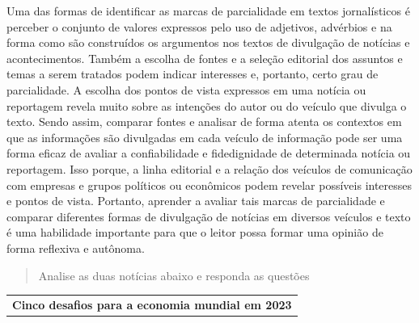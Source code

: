 {{Uma das formas de identificar as marcas de parcialidade em textos
jornalísticos é perceber o conjunto de valores expressos pelo uso de
adjetivos, advérbios e na forma como são construídos os argumentos nos
textos de divulgação de notícias e acontecimentos. Também a escolha de
fontes e a seleção editorial dos assuntos e temas a serem tratados podem
indicar interesses e, portanto, certo grau de parcialidade. A escolha
dos pontos de vista expressos em uma notícia ou reportagem revela muito
sobre as intenções do autor ou do veículo que divulga o texto. Sendo
assim, comparar fontes e analisar de forma atenta os contextos em que as
informações são divulgadas em cada veículo de informação pode ser uma
forma eficaz de avaliar a confiabilidade e fidedignidade de determinada
notícia ou reportagem. Isso porque, a linha editorial e a relação dos
veículos de comunicação com empresas e grupos políticos ou econômicos
podem revelar possíveis interesses e pontos de vista. Portanto, aprender
a avaliar tais marcas de parcialidade e comparar diferentes formas de
divulgação de notícias em diversos veículos e texto é uma habilidade
importante para que o leitor possa formar uma opinião de forma reflexiva
e autônoma.}



\begin{quote}
Analise as duas notícias abaixo e responda as questões
\end{quote}

\begin{longtable}[]{@{}
  >{\raggedright\arraybackslash}p{}@{}}
\toprule
\endhead
\textbf{Cinco desafios para a economia mundial em 2023}


\end{longtable}}

